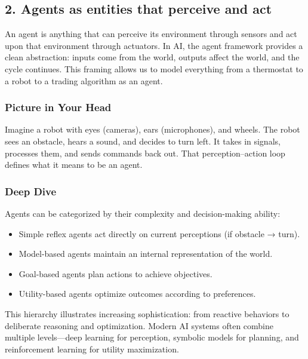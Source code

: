 \documentclass[
  letterpaper,
  DIV=11,
  numbers=noendperiod]{scrreprt}
\providecommand{\tightlist}{%
  \setlength{\itemsep}{0pt}\setlength{\parskip}{0pt}}
\begin{document}
\subsection{2. Agents as entities that perceive and
act}\label{agents-as-entities-that-perceive-and-act}

An agent is anything that can perceive its environment through sensors
and act upon that environment through actuators. In AI, the agent
framework provides a clean abstraction: inputs come from the world,
outputs affect the world, and the cycle continues. This framing allows
us to model everything from a thermostat to a robot to a trading
algorithm as an agent.

\subsubsection{Picture in Your Head}\label{picture-in-your-head-1}

Imagine a robot with eyes (cameras), ears (microphones), and wheels. The
robot sees an obstacle, hears a sound, and decides to turn left. It
takes in signals, processes them, and sends commands back out. That
perception--action loop defines what it means to be an agent.

\subsubsection{Deep Dive}\label{deep-dive-1}

Agents can be categorized by their complexity and decision-making
ability:

\begin{itemize}
\tightlist
\item
  Simple reflex agents act directly on current perceptions (if obstacle
  → turn).
\item
  Model-based agents maintain an internal representation of the world.
\item
  Goal-based agents plan actions to achieve objectives.
\item
  Utility-based agents optimize outcomes according to preferences.
\end{itemize}

This hierarchy illustrates increasing sophistication: from reactive
behaviors to deliberate reasoning and optimization. Modern AI systems
often combine multiple levels---deep learning for perception, symbolic
models for planning, and reinforcement learning for utility
maximization.
\end{document}
